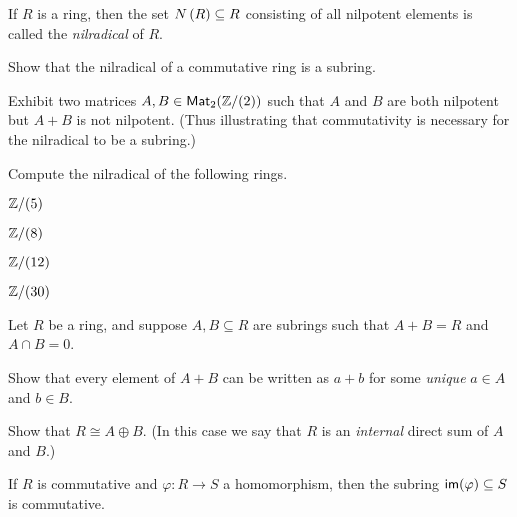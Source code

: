 \begin{dfn}[Nilradical] \label{dfn:nilradical}
If \(R\) is a ring, then the set \( N\left(R\right)  \subseteq R\) consisting of all nilpotent elements is called the \emph{nilradical} of \(R\).
\end{dfn}

\begin{exercise}
Show that the nilradical of a commutative ring is a subring.
\end{exercise}

\begin{exercise}
Exhibit two matrices \(A, B \in \mathsf{Mat}_{2}(\mathbb{Z}/(2))\) such that \(A\) and \(B\) are both nilpotent but \(A + B\) is not nilpotent.
(Thus illustrating that commutativity is necessary for the nilradical to be a subring.)
\end{exercise}

\begin{exercise}
Compute the nilradical of the following rings.
\begin{proplist*}
\item \(\mathbb{Z}/(5)\)
\item \(\mathbb{Z}/(8)\)
\item \(\mathbb{Z}/(12)\)
\item \(\mathbb{Z}/(30)\)
\end{proplist*}
\end{exercise}

\begin{exercise}
Let \(R\) be a ring, and suppose \(A,B \subseteq R\) are subrings such that \(A + B = R\) and \(A \cap B = 0\).
\begin{proplist}
\item Show that every element of \(A + B\) can be written as \(a + b\) for some \emph{unique} \(a \in A\) and \(b \in B\).
\item Show that \(R \cong A \oplus B\).
(In this case we say that \(R\) is an \emph{internal} direct sum of \(A\) and \(B\).)
\end{proplist}
\end{exercise}

\begin{exercise}
If \(R\) is commutative and \(\varphi : R \rightarrow S\) a homomorphism, then the subring \( \mathsf{im}(\varphi)  \subseteq S\) is commutative.
\end{exercise}

